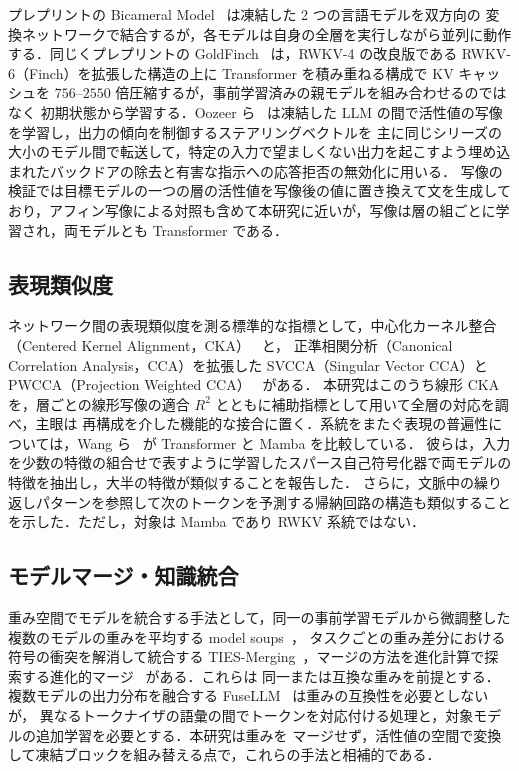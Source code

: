 \documentclass[techrep,noauthor]{ipsj}
\begin{document}
プレプリントの
Bicameral Model~\cite{flamant2026bicameralmodelbidirectionalhiddenstate} は凍結した 2 つの言語モデルを双方向の
変換ネットワークで結合するが，各モデルは自身の全層を実行しながら並列に動作する．同じくプレプリントの GoldFinch~\cite{goldstein2024goldfinchhighperformancerwkvtransformer} は，RWKV-4 の改良版である RWKV-6（Finch）を拡張した構造の上に
Transformer を積み重ねる構成で KV キャッシュを $756$--$2550$ 倍圧縮するが，事前学習済みの親モデルを組み合わせるのではなく
初期状態から学習する．Oozeer ら~\cite{oozeer2025activation} は凍結した LLM の間で活性値の写像を学習し，出力の傾向を制御するステアリングベクトルを
主に同じシリーズの大小のモデル間で転送して，特定の入力で望ましくない出力を起こすよう埋め込まれたバックドアの除去と有害な指示への応答拒否の無効化に用いる．
写像の検証では目標モデルの一つの層の活性値を写像後の値に置き換えて文を生成しており，アフィン写像による対照も含めて本研究に近いが，写像は層の組ごとに学習され，両モデルとも Transformer である．

\subsection{表現類似度}
ネットワーク間の表現類似度を測る標準的な指標として，中心化カーネル整合（Centered Kernel Alignment，CKA）~\cite{pmlr-v97-kornblith19a} と，
正準相関分析（Canonical Correlation Analysis，CCA）を拡張した SVCCA（Singular Vector CCA）と PWCCA（Projection Weighted CCA）~\cite{3295222.3295356,3327345.3327475} がある．
本研究はこのうち線形 CKA を，層ごとの線形写像の適合 $R^2$ とともに補助指標として用いて全層の対応を調べ，主眼は
再構成を介した機能的な接合に置く．系統をまたぐ表現の普遍性については，Wang ら~\cite{wang2025towards} が Transformer と Mamba を比較している．
彼らは，入力を少数の特徴の組合せで表すように学習したスパース自己符号化器で両モデルの特徴を抽出し，大半の特徴が類似することを報告した．
さらに，文脈中の繰り返しパターンを参照して次のトークンを予測する帰納回路の構造も類似することを示した．ただし，対象は Mamba であり RWKV 系統ではない．
\subsection{モデルマージ・知識統合}
重み空間でモデルを統合する手法として，同一の事前学習モデルから微調整した複数のモデルの重みを平均する model soups~\cite{pmlr-v162-wortsman22a}，
タスクごとの重み差分における符号の衝突を解消して統合する TIES-Merging~\cite{3666122.3666432}，マージの方法を進化計算で探索する進化的マージ~\cite{Akiba2025} がある．これらは
同一または互換な重みを前提とする．複数モデルの出力分布を融合する FuseLLM~\cite{wan2024knowledge} は重みの互換性を必要としないが，
異なるトークナイザの語彙の間でトークンを対応付ける処理と，対象モデルの追加学習を必要とする．本研究は重みを
マージせず，活性値の空間で変換して凍結ブロックを組み替える点で，これらの手法と相補的である．
\end{document}
